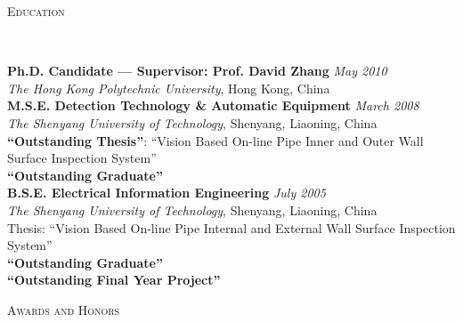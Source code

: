 \documentclass[9pt]{article}
\newenvironment{changemargin}[2]{%
  \begin{list}{}{%
    \setlength{\topsep}{0pt}%
    \setlength{\leftmargin}{#1}%
    \setlength{\rightmargin}{#2}%
    \setlength{\listparindent}{\parindent}%
    \setlength{\itemindent}{\parindent}%
    \setlength{\parsep}{\parskip}%
  }%
  \item[]}{\end{list}
}
\newcommand{\lineover}{
	\begin{changemargin}{-0.05in}{-0.05in}
		\vspace*{-8pt}
		\hrulefill \\
		\vspace*{-2pt}
	\end{changemargin}
}
\newcommand{\header}[1]{
	\begin{changemargin}{-0.5in}{-0.5in}
		\scshape{#1}\\
  	\lineover
	\end{changemargin}
}
\newenvironment{body} {
	\vspace*{-16pt}
	\begin{changemargin}{-0.25in}{-0.5in}
  }	
	{\end{changemargin}
}
\begin{document}
\medskip


\header{Education}

\begin{body}
	\vspace{14pt}
	\textbf{Ph.D. Candidate --- Supervisor: Prof. David Zhang}{} \hfill \emph{May 2010}{} \\
	\emph{The Hong Kong Polytechnic University}, Hong Kong, China{} \\
  \medskip
	\textbf{M.S.E. Detection Technology \& Automatic Equipment}{} \hfill \emph{March 2008}{} \\
	\emph{The Shenyang University of Technology}, Shenyang, Liaoning, China{} \\
	\textbf{``Outstanding Thesis''}: ``Vision Based On-line Pipe Inner and Outer Wall Surface Inspection System''\\
    \textbf{``Outstanding Graduate''}\\
  \medskip
	\textbf{B.S.E. Electrical Information Engineering} \hfill \emph{July 2005} \\
    \emph{The Shenyang University of Technology}, Shenyang, Liaoning, China{} \\
    Thesis: ``Vision Based On-line Pipe Internal and External Wall Surface Inspection System''\\
    \textbf{``Outstanding Graduate''}\\
    \textbf{``Outstanding Final Year Project''}\\
\end{body}

\medskip


\header{Awards and Honors}
\end{document}
